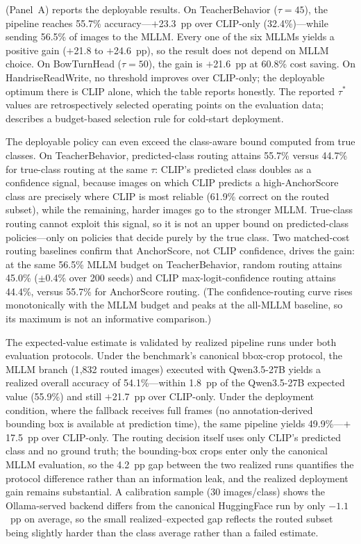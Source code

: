 \documentclass[a4paper,fleqn]{cas-sc}
\begin{document}
 (Panel~A) reports the deployable results. On TeacherBehavior ($\tau=45$), the pipeline reaches 55.7\% accuracy---$+$23.3~pp over CLIP-only (32.4\%)---while sending 56.5\% of images to the MLLM. Every one of the six MLLMs yields a positive gain ($+$21.8 to $+$24.6~pp), so the result does not depend on MLLM choice. On BowTurnHead ($\tau=50$), the gain is $+$21.6~pp at 60.8\% cost saving. On HandriseReadWrite, no threshold improves over CLIP-only; the deployable optimum there is CLIP alone, which the table reports honestly. The reported $\tau^*$ values are retrospectively selected operating points on the evaluation data;  describes a budget-based selection rule for cold-start deployment.

The deployable policy can even exceed the class-aware bound computed from true classes. On TeacherBehavior, predicted-class routing attains 55.7\% versus 44.7\% for true-class routing at the same $\tau$: CLIP's predicted class doubles as a confidence signal, because images on which CLIP predicts a high-AnchorScore class are precisely where CLIP is most reliable (61.9\% correct on the routed subset), while the remaining, harder images go to the stronger MLLM. True-class routing cannot exploit this signal, so it is not an upper bound on predicted-class policies---only on policies that decide purely by the true class. Two matched-cost routing baselines confirm that AnchorScore, not CLIP confidence, drives the gain: at the same 56.5\% MLLM budget on TeacherBehavior, random routing attains 45.0\% ($\pm$0.4\% over 200 seeds) and CLIP max-logit-confidence routing attains 44.4\%, versus 55.7\% for AnchorScore routing. (The confidence-routing curve rises monotonically with the MLLM budget and peaks at the all-MLLM baseline, so its maximum is not an informative comparison.)

The expected-value estimate is validated by realized pipeline runs under both evaluation protocols. Under the benchmark's canonical bbox-crop protocol, the MLLM branch (1{,}832 routed images) executed with Qwen3.5-27B yields a realized overall accuracy of 54.1\%---within 1.8~pp of the Qwen3.5-27B expected value (55.9\%) and still $+$21.7~pp over CLIP-only. Under the deployment condition, where the fallback receives full frames (no annotation-derived bounding box is available at prediction time), the same pipeline yields 49.9\%---$+$17.5~pp over CLIP-only. The routing decision itself uses only CLIP's predicted class and no ground truth; the bounding-box crops enter only the canonical MLLM evaluation, so the 4.2~pp gap between the two realized runs quantifies the protocol difference rather than an information leak, and the realized deployment gain remains substantial. A calibration sample (30 images/class) shows the Ollama-served backend differs from the canonical HuggingFace run by only $-1.1$~pp on average, so the small realized--expected gap reflects the routed subset being slightly harder than the class average rather than a failed estimate.
\end{document}
